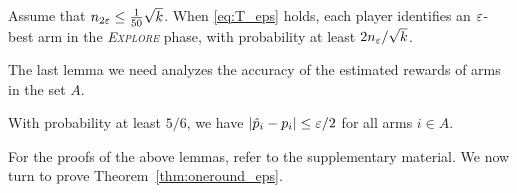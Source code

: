 \documentclass{article} %
\begin{document}
\begin{lemma} \label{lem:kexplore_eps1}
Assume that $n_{2\varepsilon} \le \tfrac{1}{50}\sqrt{k}$. When \eqref{eq:T_eps} holds, each player identifies an $\varepsilon$-best arm in the \emph{\textsc{Explore}} phase, with probability at least $2 n_\varepsilon / \sqrt{k}$.
\end{lemma}



The last lemma we need analyzes the accuracy of the estimated rewards of arms in
the set $A$. %

\begin{lemma} \label{lem:estimates_eps}
With probability at least $5/6$, we have $|\hat{p}_i - p_i| \le \varepsilon/2$ for all arms $i \in A$.
\end{lemma}



For the proofs of the above lemmas, refer to the supplementary material.
We now turn to prove Theorem~\ref{thm:oneround_eps}.
\end{document}
